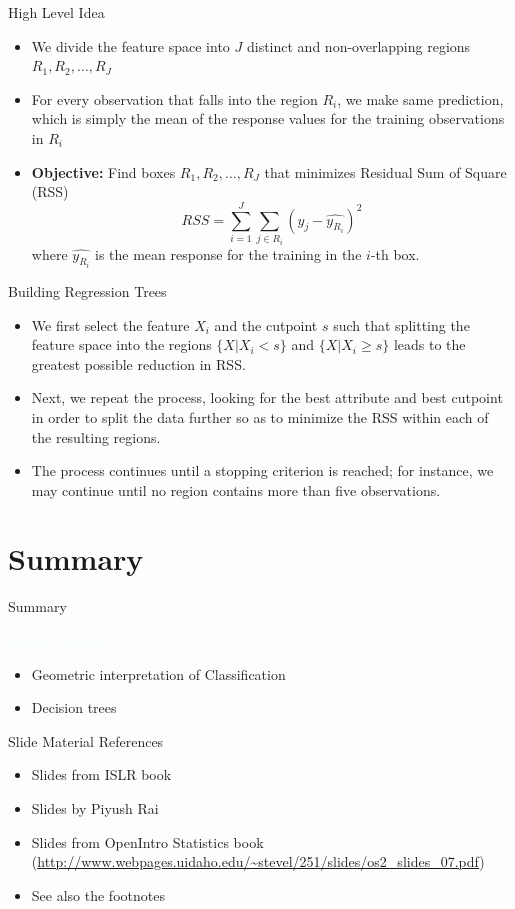 \documentclass{beamer}
\newcommand{\tblue}[1]{{\Large {\textcolor{azure}{#1}}}}
\begin{document}
\begin{frame}{High Level Idea}
    \begin{itemize}
        \item We divide the feature space into $J$ distinct and non-overlapping regions $R_1, R_2, \ldots, R_J$
        \item For every observation that falls into the region $R_i$, we make same prediction, which is simply the mean of the response values for the training observations in $R_i$
        \item {\bf Objective:} Find boxes $R_1, R_2, \ldots, R_J$  that minimizes Residual Sum of Square (RSS) 
                $$ RSS = \sum_{i=1}^{J} \sum_{j \in R_i} (y_j - \widehat{y_{R_i}})^2$$
            where $\widehat{y_{R_i}}$ is the mean response for the training in the $i$-th box.
    \end{itemize}
\end{frame}


\begin{frame}{Building Regression Trees}
    \begin{itemize}
        \item We first select the feature $X_i$ and the cutpoint $s$ such that splitting the feature space into the regions $\{X|X_i < s\}$ and $\{X|X_i \geq s\}$ leads to the greatest possible reduction in RSS.
        \item Next, we repeat the process, looking for the best attribute and best cutpoint in order to split the data further so as to minimize the RSS within each of the resulting regions.
        \item The process continues until a stopping criterion is reached; for instance, we may continue until no region contains more than five observations.
    \end{itemize}
\end{frame}



\section{Summary}
\begin{frame}{Summary}

\tblue{Major Concepts:}
\begin{itemize}
    \item Geometric interpretation of Classification
    \item Decision trees
\end{itemize}
\end{frame}

\begin{frame}{Slide Material References}
\begin{itemize}
    \item Slides from ISLR book
    \item Slides by Piyush Rai
    \item Slides from OpenIntro Statistics book (\url{http://www.webpages.uidaho.edu/~stevel/251/slides/os2_slides_07.pdf})
    \item See also the footnotes
\end{itemize}
\end{frame}
\end{document}
